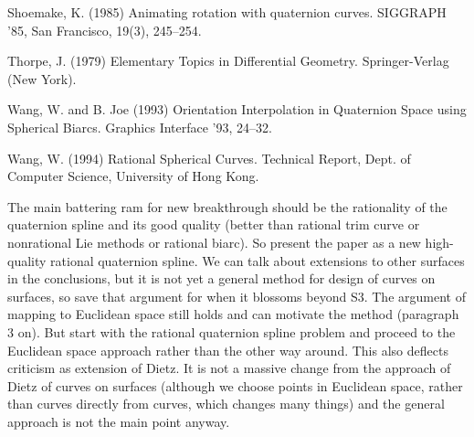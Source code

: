 \begin{thebibliography}{Lozano-Perez 83}
Shoemake, K. (1985) Animating rotation with quaternion curves.
SIGGRAPH '85, San Francisco, 19(3), 245--254.

Thorpe, J. (1979)
Elementary Topics in Differential Geometry.
Springer-Verlag (New York).

Wang, W. and B. Joe (1993)
Orientation Interpolation in Quaternion Space using Spherical Biarcs.
Graphics Interface '93, 24--32.

Wang, W. (1994)
Rational Spherical Curves.
Technical Report, Dept. of Computer Science, University of Hong Kong.


\end{thebibliography}



\ifFull
The main battering ram for new breakthrough should be the rationality
of the quaternion spline and its good quality (better than rational trim curve
or nonrational Lie methods or rational biarc).
So present the paper as a new high-quality rational quaternion spline.
We can talk about extensions to other surfaces in the conclusions, but
it is not yet a general method for design of curves on surfaces,
so save that argument for when it blossoms beyond S3.
The argument of mapping to Euclidean space still holds and can motivate
the method (paragraph 3 on).
But start with the rational quaternion spline problem and proceed
to the Euclidean space approach rather than the other way around.
This also deflects criticism as extension of Dietz.
It is not a massive change from the approach of Dietz of curves on
surfaces (although we choose points in Euclidean space, rather than 
curves directly from curves, which changes many things)
and the general approach is not the main point anyway.
\fi


